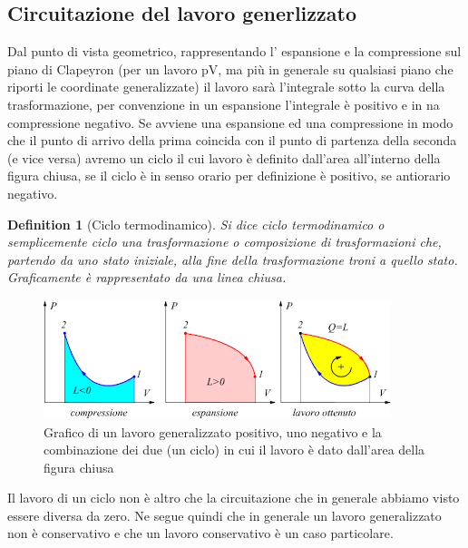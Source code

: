 \documentclass[10pt,a4paper]{article}
\newtheorem{definition}{Definition}
\begin{document}
\subsection{Circuitazione del lavoro generlizzato}
Dal punto di vista geometrico, rappresentando l' espansione e la compressione sul piano di Clapeyron (per un lavoro pV, ma più in generale su qualsiasi piano che riporti le coordinate generalizzate) il lavoro sarà l'integrale sotto la curva della trasformazione, per convenzione in un espansione l'integrale è positivo e in na compressione negativo. Se avviene una espansione ed una compressione in modo che il punto di arrivo della prima coincida con il punto di partenza della seconda (e vice versa) avremo un ciclo il cui lavoro è definito dall'area all'interno della figura chiusa, se il ciclo è in senso orario per definizione è positivo, se antiorario negativo. 
\begin{definition}[Ciclo termodinamico]
	Si dice ciclo termodinamico o semplicemente ciclo una trasformazione o composizione di trasformazioni che, partendo da uno stato iniziale, alla fine della trasformazione troni a quello stato. Graficamente è rappresentato da una linea chiusa. 
\end{definition}
\begin{figure}[h!]
	\centering
	\includegraphics[width=0.5 \linewidth]{../images/ciclo}
	\caption{Grafico di un lavoro generalizzato positivo, uno negativo e la combinazione dei due (un ciclo) in cui il lavoro è dato dall'area della figura chiusa}
	\label{fig:ciclo}
\end{figure}
\FloatBarrier
Il lavoro di un ciclo non è altro che la circuitazione che in generale abbiamo visto essere diversa da zero. Ne segue quindi che in generale un lavoro generalizzato non è conservativo e che un lavoro conservativo è un caso particolare.
\end{document}
